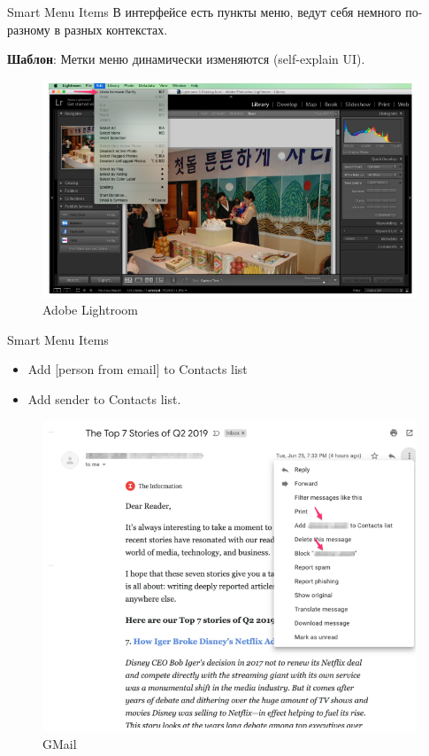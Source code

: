 \documentclass{beamer}
\begin{document}
\begin{frame}[t]{Smart Menu Items}
	В интерфейсе есть пункты меню, ведут себя немного по-разному в разных контекстах.
	
	\textbf{Шаблон}: Метки меню динамически изменяются (self-explain UI). 
	\begin{figure}[h]
		\centering
		\includegraphics[scale=0.6]{images/lec08-pic14.png}
		\caption{Adobe Lightroom}
	\end{figure}
\end{frame}

\begin{frame}[t]{Smart Menu Items}
	\begin{itemize}
		\item Add [person from email] to Contacts list
		\item Add sender to Contacts list.
	\end{itemize}
	\begin{figure}[h]
		\centering
		\includegraphics[scale=0.6]{images/lec08-pic15.png}
		\caption{GMail}
	\end{figure}
\end{frame}
\end{document}
